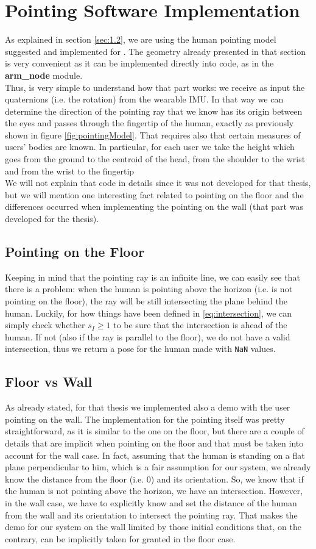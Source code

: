 \section{Pointing Software Implementation}
As explained in section \ref{sec:1.2}, we are using the human pointing model suggested and implemented for \cite{gromov2018robot}. The geometry already presented in that section is very convenient as it can be implemented directly into code, as in the \textbf{arm\_node} module.\\
Thus, is very simple to understand how that part works: we receive as input the quaternions (i.e. the rotation) from the wearable IMU. In that way we can determine the direction of the pointing ray that we know has its origin between the eyes and passes through the fingertip of the human, exactly as previously shown in figure \ref{fig:pointingModel}. That requires also that certain measures of users' bodies are known. In particular, for each user we take the height which goes from the ground to the centroid of the head, from the shoulder to the wrist and from the wrist to the fingertip\\ 
We will not explain that code in details since it was not developed for that thesis, but we will mention one interesting fact related to pointing on the floor and the differences occurred when implementing the pointing on the wall (that part was developed for the thesis).
\subsection{Pointing on the Floor}
Keeping in mind that the pointing ray is an infinite line, we can easily see that there is a problem: when the human is pointing above the horizon (i.e. is not pointing on the floor), the ray will be still intersecting the plane behind the human. Luckily, for how things have been defined in \ref{eq:intersection}, we can simply check whether $s_I \geq 1$ to be sure that the intersection is ahead of the human. If not (also if the ray is parallel to the floor), we do not have a valid intersection, thus we return a pose for the human made with \texttt{NaN} values.
\subsection{Floor vs Wall}
As already stated, for that thesis we implemented also a demo with the user pointing on the wall. The implementation for the pointing itself was pretty straightforward, as it is similar to the one on the floor, but there are a couple of details that are implicit when pointing on the floor and that must be taken into account for the wall case. In fact, assuming that the human is standing on a flat plane perpendicular to him, which is a fair assumption for our system, we already know the distance from the floor (i.e. $0$) and its orientation. So, we know that if the human is not pointing above the horizon, we have an intersection. However, in the wall case, we have to explicitly know and set the distance of the human from the wall and its orientation to intersect the pointing ray. That makes the demo for our system on the wall limited by those initial conditions that, on the contrary, can be implicitly taken for granted in the floor case.


